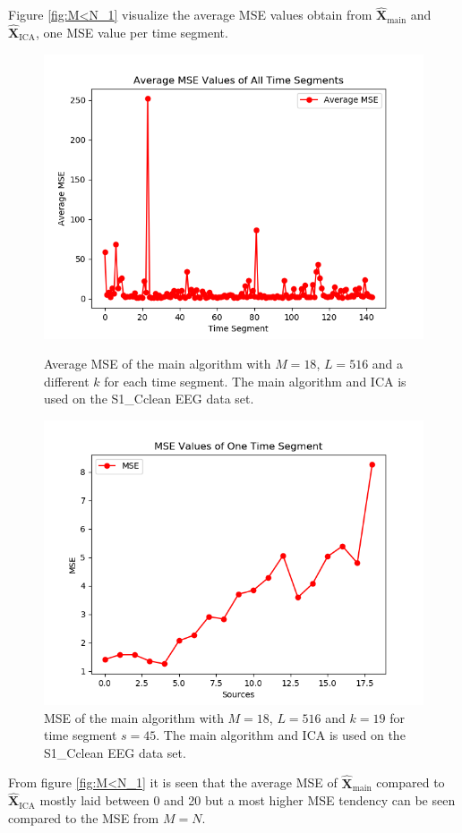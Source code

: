 Figure \ref{fig:M<N_1} visualize the average MSE values obtain from $\hat{\mathbf{X}}_{\text{main}}$ and $\hat{\mathbf{X}}_{\text{ICA}}$, one MSE value per time segment.
\begin{figure}[H]
    \begin{minipage}[t]{.45\textwidth}
		\centering
		\includegraphics[scale=0.5]{figures/ch_7/AveMSE_3M_N.png}
	\caption{Average MSE of the main algorithm with $M=18$, $L = 516$ and a different $k$ for each time segment. The main algorithm and ICA is used on the S1\_Cclean EEG data set.}
	\label{fig:M<N_1}
    \end{minipage} 
    \hfill
    \begin{minipage}[t]{.45\textwidth}
        \centering
		\includegraphics[scale=0.5]{figures/ch_7/MSE_3M_N.png}
	\caption{MSE of the main algorithm with $M=18$, $L = 516$ and $k=19$ for time segment $s=45$. The main algorithm and ICA is used on the S1\_Cclean EEG data set.}
	\label{fig:M<N_2}
    \end{minipage}
\end{figure}
\noindent
From figure \ref{fig:M<N_1} it is seen that the average MSE of $\hat{\mathbf{X}}_{\text{main}}$ compared to $\hat{\mathbf{X}}_{\text{ICA}}$ mostly laid between 0 and 20 but a most higher MSE tendency can be seen compared to the MSE from $M=N$. 

